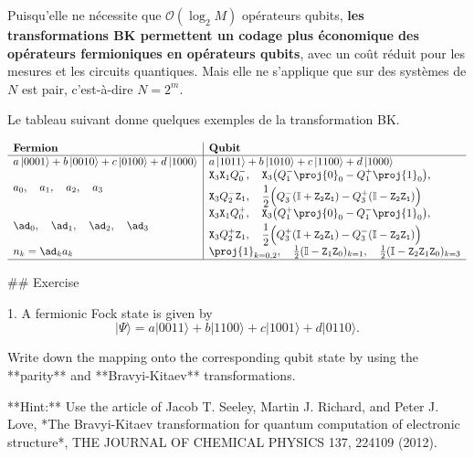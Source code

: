 \documentclass[12pt,a4paper]{article} %
\numberwithin{equation}{section} %
\numberwithin{figure}{section} %
\numberwithin{table}{section} %
\begin{document}
 Puisqu'elle ne nécessite que $\mathcal{O}(\log_2 M)$ opérateurs qubits, \textbf{les transformations BK permettent un codage plus économique des opérateurs fermioniques en opérateurs qubits}, avec un coût réduit pour les  mesures et les circuits quantiques. Mais elle ne s'applique que sur des  systèmes de $N$ est pair, c'est-à-dire $N=2^m$.

Le tableau suivant donne quelques exemples de la transformation BK.

$$
\begin{array}{l|l}
\textbf{Fermion} & \textbf{Qubit} \\ \hline
a\ket{0001}+b\ket{0010}+c\ket{0100}+d\ket{1000} & a\ket{1011}+b\ket{1010}+c\ket{1100}+d\ket{1000}  \\
a_0 ,\quad a_1 ,\quad a_2 ,\quad a_3 &
\begin{aligned}
&\mathtt{X}_3\mathtt{X}_1Q^-_0 ,\quad \mathtt{X}_3\big( Q^-_1\proj{0}_0 - Q^+_1\proj{1}_0 \big) ,\\ &\mathtt{X}_3Q^-_2\mathtt{Z}_1 ,\quad 
\frac12\Big(Q^-_3(\mathbb{I} + \mathtt{Z_2Z_1}) -  Q^+_3(\mathbb{I} - \mathtt{Z_2Z_1})\Big)
\end{aligned} \\
\ad_0 ,\quad \ad_1 ,\quad \ad_2 ,\quad \ad_3 &
\begin{aligned}
&\mathtt{X}_3\mathtt{X}_1Q^+_0 ,\quad \mathtt{X}_3\big( Q^+_1\proj{0}_0 - Q^-_1\proj{1}_0 \big) ,\\ &\mathtt{X}_3Q^+_2\mathtt{Z}_1 ,\quad 
\frac12\Big(Q^+_3(\mathbb{I} + \mathtt{Z_2Z_1}) -  Q^-_3(\mathbb{I} - \mathtt{Z_2Z_1})\Big)
\end{aligned} \\
n_k = \ad_k a_k & \proj{1}_{k=0,2} ,\quad  \frac12(\mathbb{I} - \mathtt{Z}_1\mathtt{Z}_{0})_{k=1},
\quad  \frac12(\mathbb{I} - \mathtt{Z}_2\mathtt{Z}_1\mathtt{Z}_{0})_{k=3}
\\\hline
\end{array}
$$

## Exercise

1. A fermionic Fock state is given by 
$$ |\Psi\rangle = a|0011\rangle + b|1100\rangle + c|1001\rangle + d|0110\rangle. $$

Write down the mapping onto the corresponding qubit state by using the **parity** and **Bravyi-Kitaev** transformations.

**Hint:** Use the article of Jacob T. Seeley, Martin J. Richard, and Peter J. Love, *The Bravyi-Kitaev transformation for quantum computation of electronic structure*, THE JOURNAL OF CHEMICAL PHYSICS 137, 224109 (2012).
\end{document}
